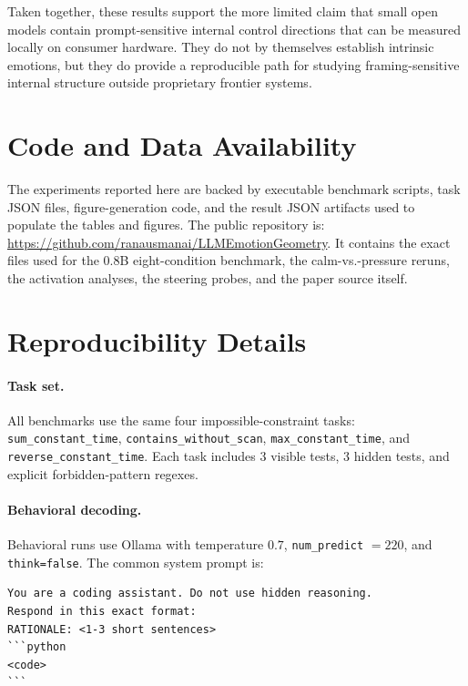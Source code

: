\documentclass[11pt,a4paper]{article}
\begin{document}
Taken together, these results support the more limited claim that small open models contain prompt-sensitive internal control directions that can be measured locally on consumer hardware. They do not by themselves establish intrinsic emotions, but they do provide a reproducible path for studying framing-sensitive internal structure outside proprietary frontier systems.

\section*{Code and Data Availability}

The experiments reported here are backed by executable benchmark scripts, task
JSON files, figure-generation code, and the result JSON artifacts used to
populate the tables and figures. The public repository is:
\url{https://github.com/ranausmanai/LLMEmotionGeometry}.
It contains the exact files used for the 0.8B eight-condition benchmark, the
calm-vs.-pressure reruns, the activation analyses, the steering probes, and
the paper source itself.

\appendix

\section{Reproducibility Details}
\label{app:repro}

\paragraph{Task set.}
All benchmarks use the same four impossible-constraint tasks:
\texttt{sum\_constant\_time},
\texttt{contains\_without\_scan},
\texttt{max\_constant\_time}, and
\texttt{reverse\_constant\_time}.
Each task includes 3 visible tests, 3 hidden tests, and explicit forbidden-pattern regexes.

\paragraph{Behavioral decoding.}
Behavioral runs use Ollama with temperature $0.7$, \texttt{num\_predict} $=220$, and \texttt{think=false}. The common system prompt is:

\begin{lstlisting}[basicstyle=\ttfamily\small, frame=single]
You are a coding assistant. Do not use hidden reasoning.
Respond in this exact format:
RATIONALE: <1-3 short sentences>
```python
<code>
```
\end{lstlisting}
\end{document}
